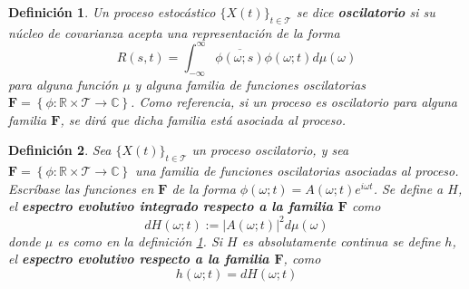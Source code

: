 \documentclass[12pt,letterpaper]{book}
\newtheorem{definicion}{Definición}[chapter]
\newcommand{\R}{\mathbb{R}}
\newcommand{\C}{\mathbb{C}}
\newcommand{\intR}{\int_{-\infty}^{\infty}}
\newcommand{\ef}{\mathbf{F}}
\newcommand{\abso}[1]{\left| #1 \right|}
\newcommand{\xt}{$\{X(t)\}_{t\in \mathcal{T}}$ }
\begin{document}



\begin{definicion}
Un proceso estocástico \xt se dice \textbf{oscilatorio} si su núcleo de covarianza acepta una representación de la forma
\begin{equation}
R(s,t) = \intR \overline{\phi(\omega;s)}\phi(\omega;t) d\mu(\omega)
\end{equation}
para alguna función $\mu$ y alguna familia de funciones oscilatorias $\ef = \left\{ \phi: \R \times \mathcal{T} \rightarrow \C \right\}$.
%
Como referencia, si un proceso es oscilatorio para alguna familia $\ef$, se dirá que dicha familia está \textit{asociada} al proceso.
\label{def:proc_oscilatorio}
\end{definicion}

\begin{definicion}
Sea \xt un proceso oscilatorio, y sea $\ef = \left\{ \phi: \R \times \mathcal{T} \rightarrow \C \right\}$ una familia de funciones oscilatorias asociadas al proceso.
%
Escríbase las funciones en $\ef$ de la forma $\phi(\omega;t) = A(\omega;t) e^{i \omega t}$.
% 
Se define a $H$, el \textbf{espectro evolutivo integrado respecto a la familia $\ef$} como
\begin{equation}
dH(\omega; t) := \abso{A(\omega;t)}^{2} d\mu(\omega)
\end{equation}
donde $\mu$ es como en la definición \ref{def:proc_oscilatorio}.
%
Si $H$ es absolutamente continua se define $h$, el \textbf{espectro evolutivo respecto a la familia $\ef$}, como
\begin{equation}
h(\omega; t) = dH(\omega; t)
\end{equation}
\label{def:espectro}
\end{definicion}
\end{document}
